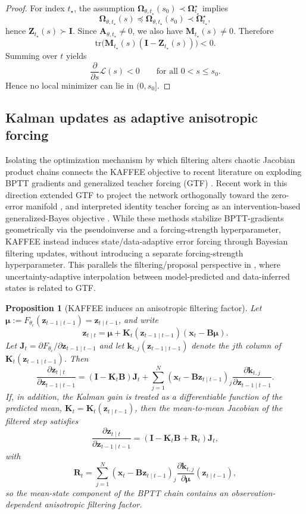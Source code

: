 \documentclass{article}
\theoremstyle{plain}
\newtheorem{proposition}{Proposition}
\theoremstyle{definition}
\theoremstyle{remark}
\newcommand{\tr}{\mathrm{tr}}
\begin{document}
\begin{proof}
For index $t_\star$, the assumption $\bm \Omega_{\theta,t_\star}(s_0)\prec \bm \Omega_{t_\star}^\star$ implies
\[
\bm \Omega_{\theta,t_\star}(s)\preceq \bm \Omega_{\theta,t_\star}(s_0)\prec \bm \Omega_{t_\star}^\star,
\]
hence $\bm Z_{t_\star}(s)\succ \bm I$.
Since $\bm A_{\theta,t_\star}\neq 0$, we also have $\bm M_{t_\star}(s)\neq 0$.
Therefore
\[
\tr \big(\bm M_{t_\star}(s)(\bm I-\bm Z_{t_\star}(s))\big)<0.
\]
Summing over $t$ yields
\[
\frac{\partial}{\partial s}\mathcal L(s)<0
\qquad \text{for all } 0<s\le s_0.
\]
Hence no local minimizer can lie in $(0,s_0]$.
\end{proof}

\subsection{Kalman updates as adaptive anisotropic forcing}
\label{app:kaffee_gtf_appendix}

Isolating the optimization mechanism by which filtering alters chaotic Jacobian product chains connects the KAFFEE objective to recent literature on exploding BPTT gradients and generalized teacher forcing (GTF) \citep{mikhaeil2022difficulty,hess2023generalized}. Recent work in this direction extended GTF to project the network orthogonally toward the zero-error manifold \citep{sagtekin2025error}, and interpreted identity teacher forcing as an intervention-based generalized-Bayes objective \citep{herz2026teacher}. While these methods stabilize BPTT-gradients geometrically via the pseudoinverse and a forcing-strength hyperparameter, KAFFEE instead induces state/data-adaptive error forcing through Bayesian filtering updates, without introducing a separate forcing-strength hyperparameter. This parallels the filtering/proposal perspective in \citep{pals2024inferring}, where uncertainty-adaptive interpolation between model-predicted and data-inferred states is related to GTF.

\begin{proposition}[KAFFEE induces an anisotropic filtering factor]
\label{prop:kaffee_gtf_factorization}
Let $\bm \mu:=F_{\theta_c}(\bm z_{t-1\mid t-1})=\bm z_{t\mid t-1}$, and write
\[
\bm z_{t\mid t}
=
\bm \mu+\bm K_t(\bm z_{t-1\mid t-1})(\bm x_t-\bm B\bm \mu).
\]
Let $\bm J_t=\partial F_{\theta_c}/\partial \bm z_{t-1\mid t-1}$ and let
$\bm k_{t,j}(\bm z_{t-1\mid t-1})$ denote the $j$th column of $\bm K_t(\bm z_{t-1\mid t-1})$.
Then
\[
\frac{\partial \bm z_{t\mid t}}{\partial \bm z_{t-1\mid t-1}}
=
(\bm I-\bm K_t\bm B)\bm J_t
+
\sum_{j=1}^N
(\bm x_t-\bm B\bm z_{t\mid t-1})_j
\frac{\partial \bm k_{t,j}}{\partial \bm z_{t-1\mid t-1}}.
\]
If, in addition, the Kalman gain is treated as a differentiable function of the
predicted mean, $\bm K_t=\bm K_t(\bm z_{t\mid t-1})$, then the mean-to-mean Jacobian of the filtered step satisfies
\[
\frac{\partial \bm z_{t\mid t}}{\partial \bm z_{t-1\mid t-1}}
=
(\bm I-\bm K_t\bm B+\bm R_t)\bm J_t,
\]
with
\[
\bm R_t=\sum_{j=1}^N
(\bm x_t-\bm B\bm z_{t\mid t-1})_j
\frac{\partial \bm k_{t,j}}{\partial \bm \mu}(\bm z_{t\mid t-1}),\]
so the mean-state component of the BPTT chain contains an observation-dependent anisotropic filtering factor. 
\end{proposition}
\end{document}
